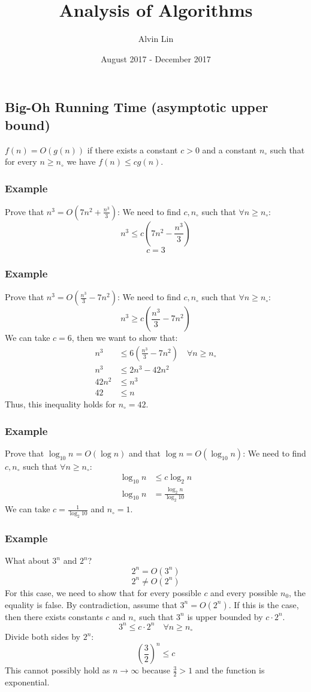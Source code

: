 \documentclass[letterpaper, 12pt]{math}
\title{Analysis of Algorithms}
\author{Alvin Lin}
\date{August 2017 - December 2017}
\begin{document}
\maketitle

\subsection*{Big-Oh Running Time (asymptotic upper bound)}
\( f(n) = O(g(n)) \) if there exists a constant \( c > 0 \) and a constant
\( n_{\circ} \) such that for every \( n\geq n_{\circ} \) we have
\( f(n)\leq cg(n) \).

\subsubsection*{Example}
Prove that \( n^3 = O(7n^2+\frac{n^3}{3}) \):
We need to find \( c,n_{\circ} \) such that \( \forall n\geq n_{\circ} \):
\[ n^3\leq c(7n^2-\frac{n^3}{3}) \]
\[ c = 3 \]

\subsubsection*{Example}
Prove that \( n^3 = O(\frac{n^3}{3}-7n^2) \):
We need to find \( c,n_{\circ} \) such that \( \forall n\geq n_{\circ} \):
\[ n^3\geq c(\frac{n^3}{3}-7n^2) \]
We can take \( c = 6 \), then we want to show that:
\begin{align*}
  n^3 &\leq 6(\frac{n^3}{3}-7n^2) \quad \forall n\geq n_{\circ} \\
  n^3 &\leq 2n^3-42n^2 \\
  42n^2 &\leq n^3 \\
  42 &\leq n
\end{align*}
Thus, this inequality holds for \( n_{\circ} = 42 \).

\subsubsection*{Example}
Prove that \( \log_{10}n = O(\log n) \) and that \( \log n = O(\log_{10}n) \):
We need to find \( c,n_{\circ} \) such that \( \forall n\geq n_{\circ} \):
\begin{align*}
  \log_{10}n &\leq c\log_{2}n \\
  \log_{10}n &= \frac{\log_{2}n}{\log_{2}10}
\end{align*}
We can take \( c = \frac{1}{\log_{2}10} \) and \( n_{\circ} = 1 \).

\subsubsection*{Example}
What about \( 3^n \) and \( 2^n \)?
\[ 2^n = O(3^n) \]
\[ 2^n \neq O(2^n) \]
For this case, we need to show that for every possible \( c \) and every
possible \( n_{0} \), the equality is false. By contradiction, assume that
\( 3^n = O(2^n) \). If this is the case, then there exists constants \( c \)
and \( n_{\circ} \) such that \( 3^n \) is upper bounded by \( c\cdot2^n \).
\[ 3^n \leq c\cdot2^n \quad \forall n\geq n_{\circ} \]
Divide both sides by \( 2^n \):
\[ (\frac{3}{2})^n \leq c \]
This cannot possibly hold as \( n\to\infty \) because \( \frac{3}{2} > 1 \)
and the function is exponential.
\end{document}
